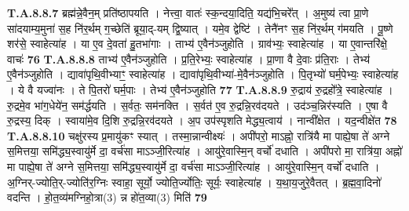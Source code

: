 \documentclass[17pt]{extarticle}
\begin{document}
                  \newline
                                                                  \textbf{ T.A.8.8.7} \newline
                  ब्रह्म॑न्ने॒वैन॒म् प्रति॑ष्ठापयति । नेत्त्वा॒ वातः॑ स्क॒न्दया॒दिति॒ यद्य॑भि॒चरे᳚त् । अ॒मुष्य॑ त्वा प्रा॒णे सा॑दयाम्य॒मुना॑ स॒ह नि॑र॒र्थम् ग॒च्छेति॑ ब्रूया॒द्-यम् द्वि॒ष्यात् । यमे॒व द्वेष्टि॑ । तेनै॑नꣳ स॒ह नि॑र॒र्थम् ग॑मयति । पू॒ष्णे शर॑से॒ स्वाहेत्या॑ह । या ए॒व दे॒वता॑ हु॒तभा॑गाः । ताभ्य॑ ए॒वैन॑ञ्जुहोति । ग्राव॑भ्यः॒ स्वाहेत्या॑ह । या ए॒वान्तरि॑क्षे॒ वाचः॑ \textbf{ 76} \newline
                  \newline
                                                                  \textbf{ T.A.8.8.8} \newline
                  ताभ्य॑ ए॒वैन॑ञ्जुहोति । प्र॒ति॒रेभ्यः॒ स्वाहेत्या॑ह । प्रा॒णा वै दे॒वाः प्र॑ति॒राः । तेभ्य॑ ए॒वैन॑ञ्जुहोति । द्यावा॑पृथि॒वीभ्याꣳ॒॒ स्वाहेत्या॑ह ।  द्यावा॑पृथि॒वीभ्या॑-मे॒वैन॑ञ्जुहोति । पि॒तृभ्यो॑ घर्म॒पेभ्यः॒ स्वाहेत्या॑ह । ये वै यज्वा॑नः । ते पि॒तरो॑ घर्म॒पाः । तेभ्य॑ ए॒वैन॑ञ्जुहोति \textbf{ 77} \newline
                  \newline
                                                                  \textbf{ T.A.8.8.9} \newline
                  रु॒द्राय॑ रु॒द्रहो᳚त्रे॒ स्वाहेत्या॑ह । रु॒द्रमे॒व भा॑ग॒धेये॑न॒ सम॑र्द्धयति । स॒र्वतः॒ सम॑नक्ति । स॒र्वत॑ ए॒व रु॒द्रन्नि॒रव॑दयते । उद॑ञ्च॒न्निर॑स्यति ।  ए॒षा वै रु॒द्रस्य॒ दिक् । स्वाया॑मे॒व दि॒शि रु॒द्रन्नि॒रव॑दयते । अ॒प उप॑स्पृशति मेद्ध्य॒त्वाय॑ । नान्वी᳚क्षेत । यद॒न्वीक्षे॑त \textbf{ 78} \newline
                  \newline
                                                                  \textbf{ T.A.8.8.10} \newline
                  चक्षु॑रस्य प्र॒मायु॑कꣳ स्यात् । तस्मा॒न्नान्वीक्ष्यः॑ ।  अपी॑परो॒ माऽह्नो॒ रात्रि॑यै मा पाह्ये॒षा ते॑ अग्ने स॒मित्तया॒ समि॑द्ध्य॒स्वायु॑र्मे दा॒ वर्च॑सा माऽञ्जी॒रित्या॑ह । आयु॑रे॒वास्मि॒न् वर्चो॑ दधाति ।  अपी॑परो मा॒ रात्रि॑या॒ अह्नो॑ मा पाह्ये॒षा ते॑ अग्ने स॒मित्तया॒ समि॑द्ध्य॒स्वायु॑र्मे दा॒ वर्च॑सा माऽञ्जी॒रित्या॑ह । आयु॑रे॒वास्मि॒न् वर्चो॑ दधाति ।  अ॒ग्निर्-ज्योति॒र्-ज्योति॑र॒ग्निः स्वाहा॒ सूर्यो॒ ज्योति॒र्ज्योतिः॒ सूर्यः॒ स्वाहेत्या॑ह । य॒था॒य॒जुरे॒वैतत् । ब्र॒ह्म॒वा॒दिनो॑ वदन्ति । हो॒त॒व्य॑मग्निहो॒त्रा(3) न्न हो॑त॒व्या(3) मिति॑ \textbf{ 79} \newline
                  \newline
\end{document}
